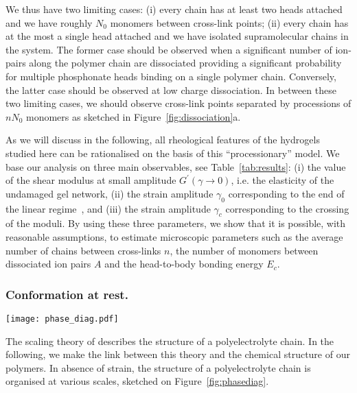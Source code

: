 \documentclass[twoside,twocolumn,9pt]{article}
\begin{document}
We thus have two limiting cases: (i) every chain has at least two heads attached and we have roughly $N_0$ monomers between cross-link points; (ii) every chain has at the most a single head attached and we have isolated supramolecular chains in the system. The former case should be observed when a significant number of ion-pairs along the polymer chain are dissociated providing a significant probability for multiple phosphonate heads binding on a single polymer chain. Conversely, the latter case should be observed at low charge dissociation. In between these two limiting cases, we should observe cross-link points separated by processions of $n N_0$ monomers as sketched in Figure~\ref{fig:dissociation}a.

As we will discuss in the following, all rheological features of the hydrogels studied here can  be rationalised on the basis of this ``processionary'' model. We base our analysis on three main observables, see Table~\ref{tab:results}: (i) the value of the shear modulus at small amplitude $G^\prime(\gamma\rightarrow 0)$, i.e. the elasticity of the undamaged gel network, (ii) the strain amplitude $\gamma_0$ corresponding to the end of the linear regime~\cite{Hyun2011}, and (iii) the strain amplitude $\gamma_c$ corresponding to the crossing of the moduli. By using these three parameters, we show that it is possible, with reasonable assumptions, to estimate microscopic parameters such as the average number of chains between cross-links $n$, the number of monomers between dissociated ion pairs $A$ and the head-to-body bonding energy $E_c$.


\subsubsection{Conformation at rest.}
\begin{figure*}
\texttt{[image: phase\_diag.pdf]}
\caption{Conformation of semi-dilute polyelectrolytes at rest at various scales as a function of dissociated charge frequency $A$. The phase diagram is given for a reduced temperature $\tau=0.46$ and for the monomer number density of , although $c$ is slightly different for each sample. Each vertical line represents a sample.}
\label{fig:phasediag}
\end{figure*}

The scaling theory of \citet{Dobrynin1995} describes the structure of a polyelectrolyte chain. In the following, we make the link between this theory and the chemical structure of our polymers. In absence of strain, the structure of a polyelectrolyte chain is organised at various scales, sketched on Figure~\ref{fig:phasediag}.
\end{document}
